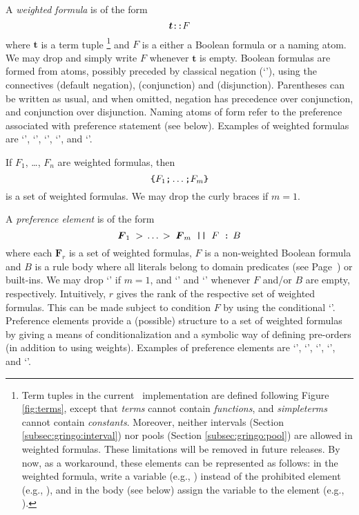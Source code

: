 A \emph{weighted formula} is of the form
\[\boldsymbol{t}\texttt{::}F\]
where $\boldsymbol{t}$ is a term tuple
\footnote{%
Term tuples in the current \asprin\ implementation are defined following Figure \ref{fig:terms}, 
except that \emph{terms} cannot contain \emph{functions}, 
and \emph{simpleterms} cannot contain \emph{constants}. 
Moreover, neither intervals (Section \ref{subsec:gringo:interval}) nor pools  (Section \ref{subsec:gringo:pool})
are allowed in weighted formulas. 
These limitations will be removed in future releases. 
By now, as a workaround, these elements can be represented as follows:
in the weighted formula, write a variable (e.g., ) instead of the prohibited element (e.g., ),  
and in the body (see below) assign the variable to the element (e.g., ).
}
and $F$ is a either a Boolean formula or a naming atom.
We may drop \code{::} and simply write $F$ whenever $\boldsymbol{t}$ is empty.
Boolean formulas are formed from atoms, possibly preceded by classical negation (`\code{-}'),
using the connectives  (default negation), \code{\&} (conjunction) and \code{|} (disjunction).
Parentheses can be written as usual,
and when omitted, negation has precedence over conjunction, and conjunction over disjunction.
%
Naming atoms of form 
refer to the preference associated with preference statement  (see below).
%
Examples of weighted formulas are 
`', 
`', 
`', 
`', and 
`'. 

If $F_1$, \ldots, $F_n$ are weighted formulas, then
\[
\texttt{\{}F_1\texttt{;}\dots\texttt{;}F_m\texttt{\}}
\]
is a set of weighted formulas.
We may drop the curly braces if $m=1$.

A \emph{preference element} is of the form
\[\boldsymbol{F}_1\;>\,\dots\,>\;\boldsymbol{F}_m\texttt{ || }F\texttt{ : }\!\!\!\! B\]
where each $\boldsymbol{F}_r$ is a set of weighted formulas, 
$F$ is a non-weighted Boolean formula
and $B$ is a rule body where all literals belong to domain predicates
(see Page~\pageref{pg:domain}) or built-ins.
%
We may drop `\code{>}' if $m=1$, 
and `' and `' whenever $F$ and/or $B$ are empty, respectively.
%
Intuitively, $r$ gives the rank of the respective set of weighted formulas.
This can be made subject to condition $F$ by using the conditional `\code{||}'.
Preference elements provide a (possible) structure to a set of weighted formulas
by giving a means of conditionalization and a symbolic way of defining pre-orders (in addition to using weights).
%
%
Examples of preference elements are 
`', 
`',  
`', 
`',  and
`'.

